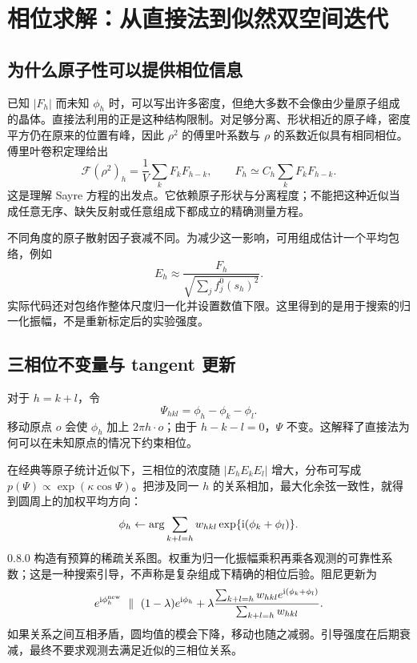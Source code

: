 \chapter{相位求解：从直接法到似然双空间迭代}
\section{为什么原子性可以提供相位信息}
已知 $|F_h|$ 而未知 $\phi_h$ 时，可以写出许多密度，但绝大多数不会像由少量原子组成的晶体。直接法利用的正是这种结构限制。对足够分离、形状相近的原子峰，密度平方仍在原来的位置有峰，因此 $\rho^2$ 的傅里叶系数与 $\rho$ 的系数近似具有相同相位。傅里叶卷积定理给出
\begin{equation}
 \mathcal F(\rho^2)_h=\frac1V\sum_k F_kF_{h-k},\qquad
 F_h\simeq C_h\sum_kF_kF_{h-k}.
\end{equation}
这是理解 Sayre 方程的出发点\cite{sayre1952}。它依赖原子形状与分离程度；不能把这种近似当成任意无序、缺失反射或任意组成下都成立的精确测量方程。

不同角度的原子散射因子衰减不同。为减少这一影响，可用组成估计一个平均包络，例如
\begin{equation}
 E_h\approx\frac{F_h}{\sqrt{\sum_j f_j^0(s_h)^2}}.
\end{equation}
实际代码还对包络作整体尺度归一化并设置数值下限。这里得到的是用于搜索的归一化振幅，不是重新标定后的实验强度。

\section{三相位不变量与 tangent 更新}
对于 $h=k+l$，令
\begin{equation}
 \Psi_{hkl}=\phi_h-\phi_k-\phi_l.
\end{equation}
移动原点 $o$ 会使 $\phi_h$ 加上 $2\pi h\cdot o$；由于 $h-k-l=0$，$\Psi$ 不变。这解释了直接法为何可以在未知原点的情况下约束相位。

在经典等原子统计近似下，三相位的浓度随 $|E_hE_kE_l|$ 增大，分布可写成 $p(\Psi)\propto\exp(\kappa\cos\Psi)$。把涉及同一 $h$ 的关系相加，最大化余弦一致性，就得到圆周上的加权平均方向\cite{cochran1955,karle1956}：
\begin{equation}
 \phi_h\leftarrow\arg\sum_{k+l=h}w_{hkl}\exp\{\mathrm{i}(\phi_k+\phi_l)\}.
\end{equation}
0.8.0 构造有预算的稀疏关系图。权重为归一化振幅乘积再乘各观测的可靠性系数；这是一种搜索引导，不声称是复杂组成下精确的相位后验。阻尼更新为
\begin{equation}
 e^{\mathrm{i}\phi_h^{\rm new}}\ \parallel\
 (1-\lambda)e^{\mathrm{i}\phi_h}+\lambda
 \frac{\sum_{k+l=h}w_{hkl}e^{\mathrm{i}(\phi_k+\phi_l)}}{\sum_{k+l=h}w_{hkl}}.
\end{equation}
如果关系之间互相矛盾，圆均值的模会下降，移动也随之减弱。引导强度在后期衰减，最终不要求观测去满足近似的三相位关系。

